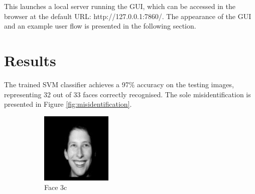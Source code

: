 This launches a local server running the GUI, which can be accessed in the browser at the default URL: http://127.0.0.1:7860/. The appearance of the GUI and an example user flow is presented in the following section.

\newpage
\section{Results}

The trained SVM classifier achieves a 97\% accuracy on the testing images, representing 32 out of 33 faces correctly recognised. The sole misidentification is presented in Figure \ref{fig:misidentification}.

\begin{figure}[ht]
  \centering
  \begin{subfigure}[b]{0.2\textwidth}
    \centering
    \includegraphics[width=\textwidth]{images/q3_face_3c.png}
    \caption{Face 3c}
  \end{subfigure}
  \hspace{3em}
  \begin{subfigure}[b]{0.2\textwidth}
    \centering

\end{subfigure}
\end{figure}
